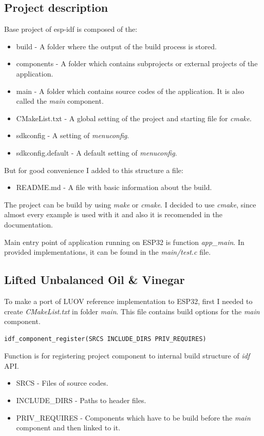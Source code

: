 \documentclass[thesis=M,english]{FITthesis}[2019/12/23]
\begin{document}
\subsection{Project description}
Base project of esp-idf is composed of the:
\begin{itemize}
\item	build - A folder where the output of the build process is stored.
\item	components - A folder which contains subprojects or external projects of the application.
\item	main - A folder which contains source codes of the application. It is also called the \textit{main} component.
\item	CMakeList.txt - A global setting of the project and starting file for \textit{cmake}.
\item	sdkconfig - A setting of \textit{menuconfig}.
\item	sdkconfig.default - A default setting of \textit{menuconfig}.
\end{itemize}
But for good convenience I added to this structure a file:
\begin{itemize}
\item	README.md - A file with basic information about the build.
\end{itemize}

\noindent
The project can be build by using \textit{make} or \textit{cmake}. I decided to use \textit{cmake}, since almost every example is used with it and also it is recomended in the documentation.

\bigskip
\noindent
Main entry point of application running on ESP32 is function \textit{app\_main}. In provided implementations, it can be found in the \textit{main/test.c} file.

\subsection{Lifted Unbalanced Oil \& Vinegar} \label{esp-luov-make}
To make a port of LUOV reference implementation to ESP32, first I needed to create \textit{CMakeList.txt} in folder \textit{main}. This file contains build options for the \textit{main} component.
\begin{lstlisting}[frame=single]
idf_component_register(SRCS INCLUDE_DIRS PRIV_REQUIRES)
\end{lstlisting}
Function is for registering project component to internal build structure of \textit{idf} API.
\begin{itemize}
\item	SRCS - Files of source codes.
\item	INCLUDE\_DIRS - Paths to header files.
\item	PRIV\_REQUIRES - Components which have to be build before the \textit{main} component and then linked to it.
\end{itemize}
\end{document}
